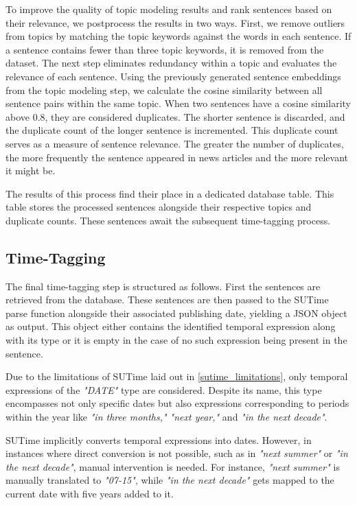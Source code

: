 \documentclass[12pt,oneside,bibtotoc,liststotoc]{scrbook}
\begin{document}
To improve the quality of topic modeling results and rank sentences based on their relevance, we postprocess the results in two ways.
First, we remove outliers from topics by matching the topic keywords against the words in each sentence. If a sentence contains fewer than three topic keywords, it is removed from the dataset. The next step eliminates redundancy within a topic and evaluates the relevance of each sentence. Using the previously generated sentence embeddings from the topic modeling step, we calculate the cosine similarity between all sentence pairs within the same topic. When two sentences have a cosine similarity above 0.8, they are considered duplicates. The shorter sentence is discarded, and the duplicate count of the longer sentence is incremented. This duplicate count serves as a measure of sentence relevance. The greater the number of duplicates, the more frequently the sentence appeared in news articles and the more relevant it might be.

The results of this process find their place in a dedicated database table. This table stores the processed sentences alongside their respective topics and duplicate counts. These sentences await the subsequent time-tagging process.

\subsection{Time-Tagging}
The final time-tagging step is structured as follows. First the sentences are retrieved from the database. These sentences are then passed to the SUTime parse function alongside their associated publishing date, yielding a JSON object as output. This object either contains the identified temporal expression along with its type or it is empty in the case of no such expression being present in the sentence.

Due to the limitations of SUTime laid out in \ref{sutime_limitations}, only temporal expressions of the \textit{"DATE"} type are considered. Despite its name, this type encompasses not only specific dates but also expressions corresponding to periods within the year like \textit{"in three months," "next year,"} and \textit{"in the next decade"}.

SUTime implicitly converts temporal expressions into dates. However, in instances where direct conversion is not possible, such as in \textit{"next summer"} or \textit{"in the next decade"}, manual intervention is needed. For instance, \textit{"next summer"} is manually translated to \textit{"07-15"}, while \textit{"in the next decade"} gets mapped to the current date with five years added to it.
\end{document}
